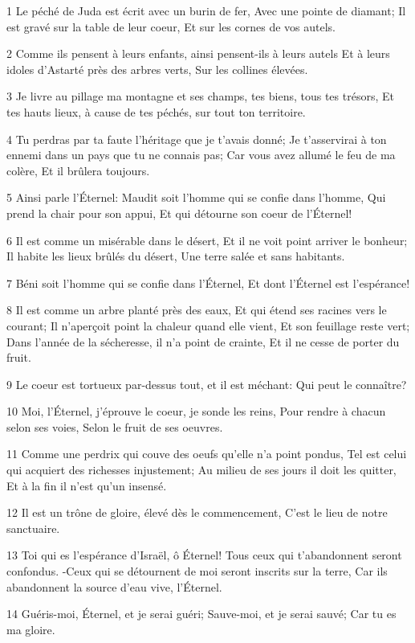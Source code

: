 \par 1 Le péché de Juda est écrit avec un burin de fer, Avec une pointe de diamant; Il est gravé sur la table de leur coeur, Et sur les cornes de vos autels.
\par 2 Comme ils pensent à leurs enfants, ainsi pensent-ils à leurs autels Et à leurs idoles d'Astarté près des arbres verts, Sur les collines élevées.
\par 3 Je livre au pillage ma montagne et ses champs, tes biens, tous tes trésors, Et tes hauts lieux, à cause de tes péchés, sur tout ton territoire.
\par 4 Tu perdras par ta faute l'héritage que je t'avais donné; Je t'asservirai à ton ennemi dans un pays que tu ne connais pas; Car vous avez allumé le feu de ma colère, Et il brûlera toujours.
\par 5 Ainsi parle l'Éternel: Maudit soit l'homme qui se confie dans l'homme, Qui prend la chair pour son appui, Et qui détourne son coeur de l'Éternel!
\par 6 Il est comme un misérable dans le désert, Et il ne voit point arriver le bonheur; Il habite les lieux brûlés du désert, Une terre salée et sans habitants.
\par 7 Béni soit l'homme qui se confie dans l'Éternel, Et dont l'Éternel est l'espérance!
\par 8 Il est comme un arbre planté près des eaux, Et qui étend ses racines vers le courant; Il n'aperçoit point la chaleur quand elle vient, Et son feuillage reste vert; Dans l'année de la sécheresse, il n'a point de crainte, Et il ne cesse de porter du fruit.
\par 9 Le coeur est tortueux par-dessus tout, et il est méchant: Qui peut le connaître?
\par 10 Moi, l'Éternel, j'éprouve le coeur, je sonde les reins, Pour rendre à chacun selon ses voies, Selon le fruit de ses oeuvres.
\par 11 Comme une perdrix qui couve des oeufs qu'elle n'a point pondus, Tel est celui qui acquiert des richesses injustement; Au milieu de ses jours il doit les quitter, Et à la fin il n'est qu'un insensé.
\par 12 Il est un trône de gloire, élevé dès le commencement, C'est le lieu de notre sanctuaire.
\par 13 Toi qui es l'espérance d'Israël, ô Éternel! Tous ceux qui t'abandonnent seront confondus. -Ceux qui se détournent de moi seront inscrits sur la terre, Car ils abandonnent la source d'eau vive, l'Éternel.
\par 14 Guéris-moi, Éternel, et je serai guéri; Sauve-moi, et je serai sauvé; Car tu es ma gloire.
